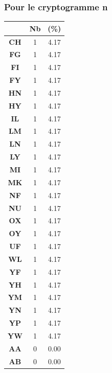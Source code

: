 \documentclass[a4paper, titlepage]{livret}
\begin{document}
\subsubsection{Pour le cryptogramme n}

\begin{center}
\begin{minipage}[c]{.3\linewidth}
\begin{tabular}{|c|c|c|}
 \hline
	& \textbf{Nb} & \textbf{(\%)}\\
	\hline
 	\textbf{CH} &       1 &  4.17\\
	\hline
	\textbf{FG} &       1 &  4.17\\
	\hline
	\textbf{FI} &       1 &  4.17\\
	\hline
	\textbf{FY} &       1 &  4.17\\
	\hline
	\textbf{HN} &       1 &  4.17\\
	\hline
	\textbf{HY} &       1 &  4.17\\
	\hline
	\textbf{IL} &       1 &  4.17\\
	\hline
	\textbf{LM} &       1 &  4.17\\
	\hline
	\textbf{LN} &       1 &  4.17\\
	\hline
	\textbf{LY} &       1 &  4.17\\
	\hline
	\textbf{MI} &       1 &  4.17\\
	\hline
	\textbf{MK} &       1 &  4.17\\
	\hline
	\textbf{NF} &       1 &  4.17\\
	\hline
	\textbf{NU} &       1 &  4.17\\
	\hline
	\textbf{OX} &       1 &  4.17\\
	\hline
	\textbf{OY} &       1 &  4.17\\
	\hline
	\textbf{UF} &       1 &  4.17\\
	\hline
	\textbf{WL} &       1 &  4.17\\
	\hline
	\textbf{YF} &       1 &  4.17\\
	\hline
	\textbf{YH} &       1 &  4.17\\
	\hline
	\textbf{YM} &       1 &  4.17\\
	\hline
	\textbf{YN} &       1 &  4.17\\
	\hline
	\textbf{YP} &       1 &  4.17\\
	\hline
	\textbf{YW} &       1 &  4.17\\
	\hline
	\textbf{AA} &       0 &  0.00\\
	\hline
	\textbf{AB} &       0 &  0.00\\

\end{tabular}
\end{minipage}
\end{center}
\end{document}
